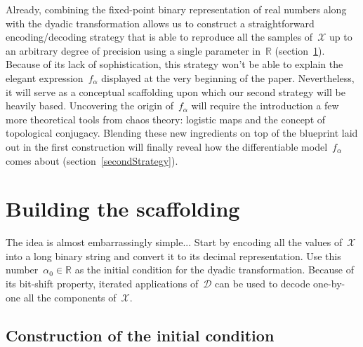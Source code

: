 \documentclass{article}
\begin{document}
\noindent Already, combining the fixed-point binary representation of real numbers along with the dyadic transformation allows us to construct a straightforward encoding/decoding strategy that is able to reproduce all the samples of~$\mathcal{X}$ up to an arbitrary degree of precision using a single parameter in~$\mathbb{R}$ (section~\ref{lab:naive}).  Because of its lack of sophistication, this strategy won't be able to explain the elegant expression~$f_\alpha$ displayed at the very beginning of the paper.  Nevertheless, it will serve as a conceptual scaffolding upon which our second strategy will be heavily based.  Uncovering the origin of~$f_\alpha$ will require the introduction a few more theoretical tools from chaos theory: logistic maps and the concept of topological conjugacy.  Blending these new ingredients on top of the blueprint laid out in the first construction will finally reveal how the differentiable model~$f_\alpha$ comes about (section~\ref{secondStrategy}).

\section{Building the scaffolding}
\label{lab:naive}

The idea is almost embarrassingly simple...  Start by encoding all the values of~$\mathcal{X}$ into a long binary string and convert it to its decimal representation.  Use this number~$\alpha_0 \in \mathbb{R}$ as the initial condition for the dyadic transformation.  Because of its bit-shift property, iterated applications of~$\mathcal{D}$ can be used to decode one-by-one all the components of~$\mathcal{X}$.

\subsection{Construction of the initial condition}
\label{naive::init}
\end{document}
